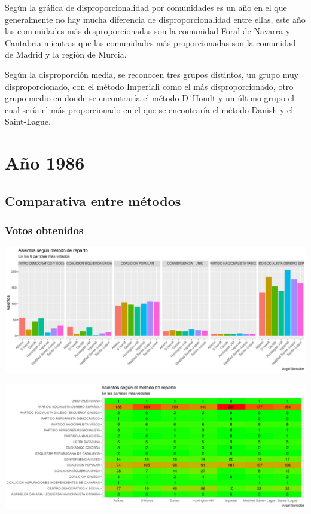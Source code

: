 \documentclass[12pt,a4paper,]{book}
\numberwithin{dummy}{section}
\theoremstyle{ocrenumbox}
\theoremstyle{blacknumex}
\theoremstyle{blacknumbox}
\theoremstyle{ocrenum}
\theoremstyle{ocrenum}
\begin{document}
Según la gráfica de disproporcionalidad por comunidades es un año en el
que generalmente no hay mucha diferencia de disproporcionalidad entre
ellas, este año las comunidades más desproporcionadas son la comunidad
Foral de Navarra y Cantabria mientras que las comunidades más
proporcionadas son la comunidad de Madrid y la región de Murcia.

Según la disproporción media, se reconocen tres grupos distintos, un
grupo muy disproporcionado, con el método Imperiali como el más
disproporcionado, otro grupo medio en donde se encontraría el método
D´Hondt y un último grupo el cual sería el más proporcionado en el que
se encontraría el método Danish y el Saint-Lague.

\hypertarget{auxf1o-1986}{%
\section{Año 1986}\label{auxf1o-1986}}

\hypertarget{comparativa-entre-muxe9todos-3}{%
\subsection{Comparativa entre
métodos}\label{comparativa-entre-muxe9todos-3}}

\hypertarget{votos-obtenidos-3}{%
\subsubsection{Votos obtenidos}\label{votos-obtenidos-3}}

\begin{center}\includegraphics[width=0.95\linewidth]{figurasR/unnamed-chunk-86-1} \end{center}

\begin{center}\includegraphics[width=0.95\linewidth]{figurasR/unnamed-chunk-86-2} \end{center}
\end{document}
